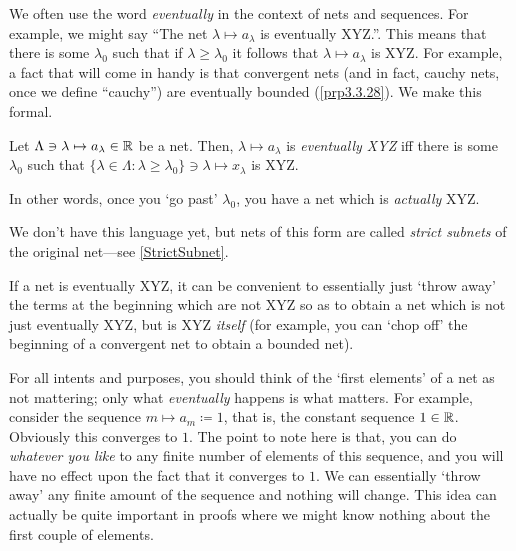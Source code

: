 We often use the word \emph{eventually} in the context of nets and sequences.  For example, we might say ``The net $\lambda \mapsto a_\lambda$ is eventually XYZ.''.  This means that there is some $\lambda _0$ such that if $\lambda \geq \lambda _0$ it follows that $\lambda \mapsto a_\lambda$ is XYZ.  For example, a fact that will come in handy is that convergent nets (and in fact, cauchy nets, once we define ``cauchy'') are eventually bounded (\cref{prp3.3.28}).  We make this formal.
\begin{mdf}\label{EventuallyXYZ}
Let $\Lambda \ni \lambda \mapsto a_\lambda \in \mathbb{R}$ be a net.  Then, $\lambda \mapsto a_\lambda$ is \emph{eventually XYZ} iff there is some $\lambda _0$ such that $\{ \lambda \in \Lambda :\lambda \geq \lambda _0\} \ni \lambda \mapsto x_\lambda$ is XYZ.
\begin{rmk}
In other words, once you `go past' $\lambda _0$, you have a net which is \emph{actually} XYZ.
\end{rmk}
\begin{rmk}
We don't have this language yet, but nets of this form are called \emph{strict subnets} of the original net---see \cref{StrictSubnet}.
\end{rmk}
\end{mdf}

If a net is eventually XYZ, it can be convenient to essentially just `throw away' the terms at the beginning which are not XYZ so as to obtain a net which is not just eventually XYZ, but is XYZ \emph{itself} (for example, you can `chop off' the beginning of a convergent net to obtain a bounded net).

For all intents and purposes, you should think of the `first elements' of a net as not mattering; only what \emph{eventually} happens is what matters.  For example, consider the sequence $m\mapsto a_m\coloneqq 1$, that is, the constant sequence $1\in \mathbb{R}$.  Obviously this converges to $1$.  The point to note here is that, you can do \emph{whatever you like} to any finite number of elements of this sequence, and you will have no effect upon the fact that it converges to $1$.  We can essentially `throw away' any finite amount of the sequence and nothing will change.  This idea can actually be quite important in proofs where we might know nothing about the first couple of elements.

\horizontalrule


